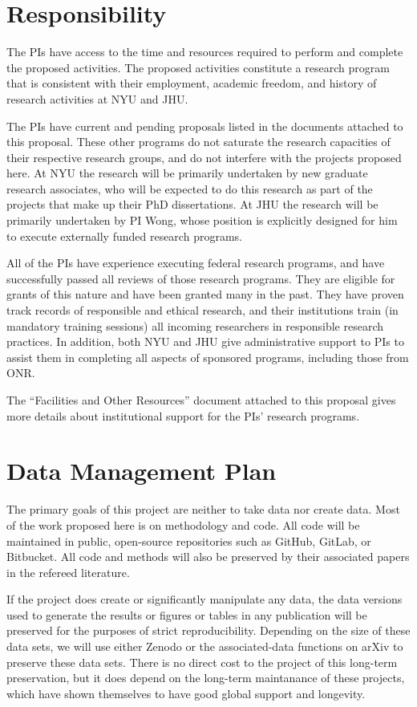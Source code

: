 \documentclass[11pt]{article}
\begin{document}
\section{Responsibility}
The PIs have access to the time and resources required to perform and complete the proposed activities.
The proposed activities constitute a research program that is consistent with their employment, academic freedom, and history of research activities at NYU and JHU.

The PIs have current and pending proposals listed in the documents attached to this proposal.
These other programs do not saturate the research capacities of their respective research groups, and do not interfere with the projects proposed here.
At NYU the research will be primarily undertaken by new graduate research associates, who will be expected to do this research as part of the projects that make up their PhD dissertations.
At JHU the research will be primarily undertaken by PI Wong, whose position is explicitly designed for him to execute externally funded research programs.

All of the PIs have experience executing federal research programs, and have successfully passed all reviews of those research programs.
They are eligible for grants of this nature and have been granted many in the past.
They have proven track records of responsible and ethical research, and their institutions train (in mandatory training sessions) all incoming researchers in responsible research practices.
In addition, both NYU and JHU give administrative support to PIs to assist them in completing all aspects of sponsored programs, including those from ONR.

The ``Facilities and Other Resources'' document attached to this proposal gives more details about institutional support for the PIs' research programs.

\section{Data Management Plan}
The primary goals of this project are neither to take data nor create data.
Most of the work proposed here is on methodology and code.
All code will be maintained in public, open-source repositories such as GitHub, GitLab, or Bitbucket.
All code and methods will also be preserved by their associated papers in the refereed literature.

If the project does create or significantly manipulate any data,
the data versions used to generate the results or figures or tables in any publication will be preserved for the purposes of strict reproducibility.
Depending on the size of these data sets, we will use either Zenodo or the associated-data functions on arXiv to preserve these data sets.
There is no direct cost to the project of this long-term preservation, but it does depend on the long-term maintanance of these projects, which have shown themselves to have good global support and longevity.
\end{document}

